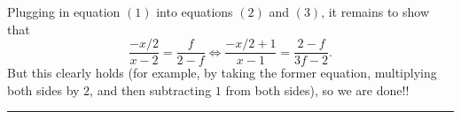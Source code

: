 \documentclass{article}
\begin{document}
\begin{solution}
Plugging in equation $(1)$ into equations $(2)$ and $(3)$, it remains to show that 
\[\frac{-x/2}{x-2} = \frac{f}{2-f} \Longleftrightarrow \frac{-x/2+1}{x-1} = \frac{2-f}{3f-2}.\]
But this clearly holds (for example, by taking the former equation, multiplying both sides by $2$, and then subtracting $1$ from both sides), so we are done!!

\vspace{0.3cm} \rule{\textwidth}{0.3pt}
\end{solution}


\end{document}
